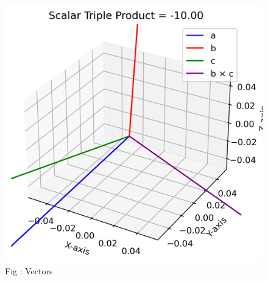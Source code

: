 \documentclass[journal,12pt,onecolumn]{IEEEtran}
\theoremstyle{remark}
\begin{document}
\pagebreak

\begin{figure}[h!]
  \centering
  \includegraphics[width=0.7\columnwidth]{figs/vectors.png} 
   \caption*{Fig : Vectors}
  \label{Fig1}
\end{figure}
\end{document}
